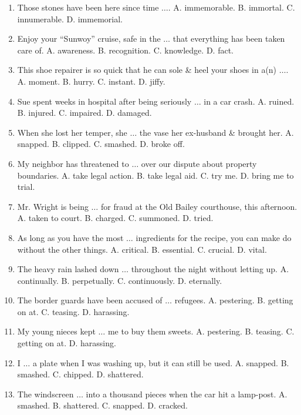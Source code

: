 \documentclass{article}
\numberwithin{equation}{section}
\begin{document}
\begin{enumerate}[leftmargin=8mm]
	\item Those stones have been here since time $\ldots$. {\sf A.} immemorable. {\sf B.} immortal. {\sf C.} innumerable. {\sf D.} immemorial.
	\item Enjoy your ``Sunwoy'' cruise, safe in the $\ldots$ that everything has been taken care of. {\sf A.} awareness. {\sf B.} recognition. {\sf C.} knowledge. {\sf D.} fact.
	\item This shoe repairer is so quick that he can sole \& heel your shoes in a(n) $\ldots$. {\sf A.} moment. {\sf B.} hurry. {\sf C.} instant. {\sf D.} jiffy.
	\item Sue spent weeks in hospital after being seriously $\ldots$ in a car crash. {\sf A.} ruined. {\sf B.} injured. {\sf C.} impaired. {\sf D.} damaged.
	\item When she lost her temper, she $\ldots$ the vase her ex-husband \& brought her. {\sf A.} snapped. {\sf B.} clipped. {\sf C.} smashed. {\sf D.} broke off.
	\item My neighbor has threatened to $\ldots$ over our dispute about property boundaries. {\sf A.} take legal action. {\sf B.} take legal aid. {\sf C.} try me. {\sf D.} bring me to trial.
	\item Mr. Wright is being $\ldots$ for fraud at the Old Bailey courthouse, this afternoon. {\sf A.} taken to court. {\sf B.} charged. {\sf C.} summoned. {\sf D.} tried.
	\item As long as you have the most $\ldots$ ingredients for the recipe, you can make do without the other things. {\sf A.} critical. {\sf B.} essential. {\sf C.} crucial. {\sf D.} vital.
	\item The heavy rain lashed down $\ldots$ throughout the night without letting up. {\sf A.} continually. {\sf B.} perpetually. {\sf C.} continuously. {\sf D.} eternally.
	\item The border guards have been accused of $\ldots$ refugees. {\sf A.} pestering. {\sf B.} getting on at. {\sf C.} teasing. {\sf D.} harassing.
	\item My young nieces kept $\ldots$ me to buy them sweets. {\sf A.} pestering. {\sf B.} teasing. {\sf C.} getting on at. {\sf D.} harassing.
	\item I $\ldots$ a plate when I was washing up, but it can still be used. {\sf A.} snapped. {\sf B.} smashed. {\sf C.} chipped. {\sf D.} shattered.
	\item The windscreen $\ldots$ into a thousand pieces when the car hit a lamp-post. {\sf A.} smashed. {\sf B.} shattered. {\sf C.} snapped. {\sf D.} cracked.

\end{enumerate}
\end{document}
